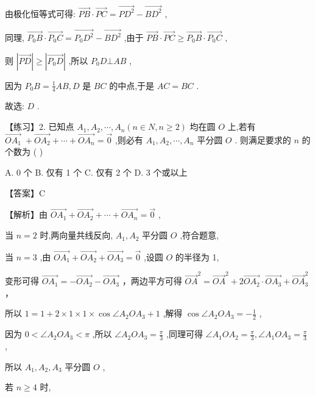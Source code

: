 \documentclass[10pt]{article}
\begin{document}
由极化恒等式可得: \(\overrightarrow{PB} \cdot  \overrightarrow{PC} = \overrightarrow{P{D}^{2}} - \overrightarrow{B{D}^{2}}\) ,

同理, \(\overrightarrow{{P}_{0}B} \cdot  \overrightarrow{{P}_{0}C} = \overrightarrow{{P}_{0}{D}^{2}} - \overrightarrow{B{D}^{2}}\) ,由于 \(\overrightarrow{PB} \cdot  \overrightarrow{PC} \geq  \overrightarrow{{P}_{0}B} \cdot  \overrightarrow{{P}_{0}C}\) ,

则 \(\left| \overrightarrow{PD}\right|  \geq  \left| \overrightarrow{{P}_{0}D}\right|\) ,所以 \({P}_{0}D \bot  {AB}\) ,

因为 \({P}_{0}B = \frac{1}{4}{AB},D\) 是 \({BC}\) 的中点,于是 \({AC} = {BC}\) .

故选: \(D\) .

【练习】2. 已知点 \({A}_{1},{A}_{2},\cdots ,{A}_{n}\left( {n \in  N,n \geq  2}\right)\) 均在圆 \(O\) 上,若有 \(\overrightarrow{O{A}_{1}} \; + \overrightarrow{O{A}_{2}} + \cdots  + \overrightarrow{O{A}_{n}} = \overrightarrow{0}\) ,则必有 \({A}_{1},{A}_{2},\cdots ,{A}_{n}\) 平分圆 \(O\) . 则满足要求的 \(n\) 的个数为 ( )

A. 0 个 B. 仅有 1 个 C. 仅有 2 个 D. 3 个或以上

【答案】C

【解析】由 \(\overrightarrow{O{A}_{1}} + \overrightarrow{O{A}_{2}} + \cdots  + \overrightarrow{O{A}_{n}} = \overrightarrow{0}\) ,

当 \(n = 2\) 时,两向量共线反向, \({A}_{1},{A}_{2}\) 平分圆 \(O\) ,符合题意,

当 \(n = 3\) ,由 \(\overrightarrow{O{A}_{1}} + \overrightarrow{O{A}_{2}} + \overrightarrow{O{A}_{3}} = \overrightarrow{0}\) ,设圆 \(O\) 的半径为 1,

变形可得 \(\overrightarrow{O{A}_{1}} =  - \overrightarrow{O{A}_{2}} - \overrightarrow{O{A}_{3}}\) ，两边平方可得 \({\overrightarrow{OA}}^{2} = {\overrightarrow{OA}}^{2} + 2\overrightarrow{O{A}_{2}} \cdot  \overrightarrow{O{A}_{3}} + {\overrightarrow{OA}}_{3}^{2}\) ，

所以 \(1 = 1 + 2 \times  1 \times  1 \times  \cos \angle {A}_{2}O{A}_{3} + 1\) ,解得 \(\cos \angle {A}_{2}O{A}_{3} =  - \frac{1}{2}\) ,

因为 \(0 < \angle {A}_{2}O{A}_{3} < \pi\) ,所以 \(\angle {A}_{2}O{A}_{3} = \frac{\pi }{3}\) ,同理可得 \(\angle {A}_{1}O{A}_{2} = \frac{\pi }{3},\angle {A}_{1}O{A}_{3} = \frac{\pi }{3}\) ,

所以 \({A}_{1},{A}_{2},{A}_{3}\) 平分圆 \(O\) ,

若 \(n \geq  4\) 时,
\end{document}
